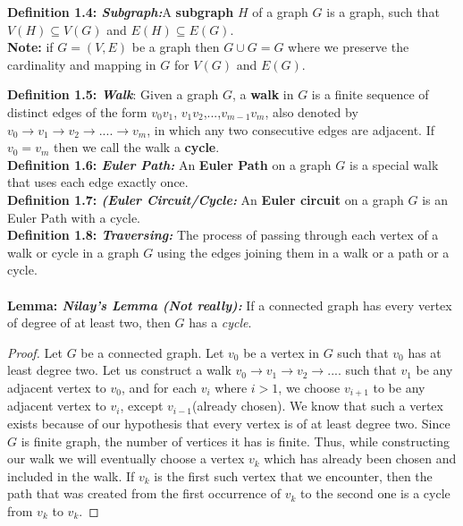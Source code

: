 \documentclass[12pt, fullpage]{article}
\begin{document}
\textbf{Definition 1.4: \textit{Subgraph:}}A \textbf{subgraph} $H$ of a graph $G$ is a graph, such that $V(H) \subseteq V(G)$ and $E(H) \subseteq E(G)$.\\

\textbf{Note:} if $G=(V,E)$ be a graph then $G \cup G = G$ where we preserve the cardinality and mapping in $G$ for $V(G)$ and $E(G)$.

\textbf{Definition 1.5: \textit{Walk}}: Given a graph $G$, a \textbf{walk} in $G$ is a finite sequence of distinct edges of the form $v_0v_1$, $v_1v_2$,...,$v_{m-1}v_m$, also denoted by $v_0 \rightarrow v_1 \rightarrow v_2 \rightarrow ....\rightarrow v_m$, in which any two consecutive edges are adjacent.  If $v_0 = v_m$ then we call the walk a \textbf{cycle}.\\

\textbf{Definition 1.6: \textit{Euler Path: }}An \textbf{Euler Path} on a graph $G$ is a special walk that uses each edge exactly once.\\

\textbf{Definition 1.7: \textit{(Euler Circuit/Cycle: }}An \textbf{Euler circuit} on a graph $G$ is an Euler Path with a cycle.\\

\textbf{Definition 1.8: \textit{Traversing: }}The process of passing through each vertex of a  walk or cycle in a graph $G$ using the edges joining them in a walk or a path or a cycle.\\ \\

\textbf{Lemma: \textit{Nilay's Lemma (Not really):}} If a connected graph has every vertex of degree of at least two, then $G$ has a \textit{cycle}.
\begin{proof}
Let $G$ be a connected graph. Let $v_0$ be a vertex in $G$ such that $v_0$ has at least degree two. Let us construct a walk $v_0 \rightarrow v_1 \rightarrow v_2 \rightarrow ....$ such that $v_1$ be any adjacent vertex to $v_0$, and for each $v_i$ where $i > 1$, we choose $v_{i+1}$ to be any adjacent vertex to $v_i$, except $v_{i-1}$(already chosen). We know that such a vertex exists because of our hypothesis that every vertex is of at least degree two. Since $G$ is finite graph, the number of vertices it has is finite. Thus, while constructing our walk we will eventually choose a vertex $v_k$ which has already been chosen and included in the walk. If $v_k$ is the first such vertex that we encounter, then the path that was created from the first occurrence of $v_k$ to the second one is a cycle from $v_k$ to $v_k$.
\end{proof}
\end{document}

